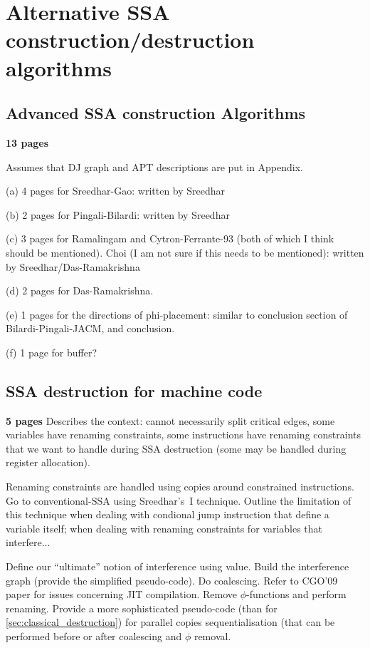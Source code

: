 \chapter{Alternative SSA construction/destruction algorithms
   }

\section{Advanced SSA construction Algorithms}
\label{sec:advanced_construction}
\textbf{13 pages}

Assumes that DJ graph and APT 
descriptions are put in Appendix.

(a) 4 pages for Sreedhar-Gao: written by Sreedhar

(b) 2 pages for Pingali-Bilardi: written by Sreedhar

(c) 3 pages for Ramalingam and Cytron-Ferrante-93 (both of which I think
should be mentioned). Choi (I am not sure if this needs to be mentioned):
written by Sreedhar/Das-Ramakrishna

(d) 2 pages for Das-Ramakrishna.

(e) 1 pages for the directions of phi-placement: similar to conclusion
section of Bilardi-Pingali-JACM, and conclusion.

(f) 1 page for buffer?


\section{SSA destruction for machine code }
\label{sec:advanced_destruction}
\textbf{5 pages}
Describes the context: cannot necessarily split critical edges, some variables have renaming constraints, some instructions have renaming constraints that we want to handle during SSA destruction (some may be handled during register allocation). 

Renaming constraints are handled using copies around constrained instructions. Go to conventional-SSA using Sreedhar's~I technique. Outline the limitation of this technique when dealing with condional jump instruction that define a variable itself; when dealing with renaming constraints for variables that interfere...

Define our ``ultimate'' notion of interference using value. Build the interference graph (provide the simplified pseudo-code). Do coalescing. Refer to CGO'09 paper for issues concerning JIT compilation. Remove $\phi$-functions and perform renaming. Provide a more sophisticated pseudo-code (than for \ref{sec:classical_destruction}) for parallel copies sequentialisation (that can be performed before or after coalescing and $\phi$ removal.

